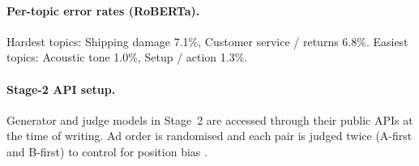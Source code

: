 \documentclass[11pt]{article}
\begin{document}
\paragraph{Per-topic error rates (RoBERTa).}
Hardest topics: Shipping damage 7.1\%, Customer service / returns
6.8\%.
Easiest topics: Acoustic tone 1.0\%, Setup / action 1.3\%.

\paragraph{Stage-2 API setup.}
Generator and judge models in Stage~2 are accessed through their
public APIs at the time of writing.
Ad order is randomised and each pair is judged twice
(A-first and B-first) to control for position bias
\cite{zheng2023judging}.
\end{document}
